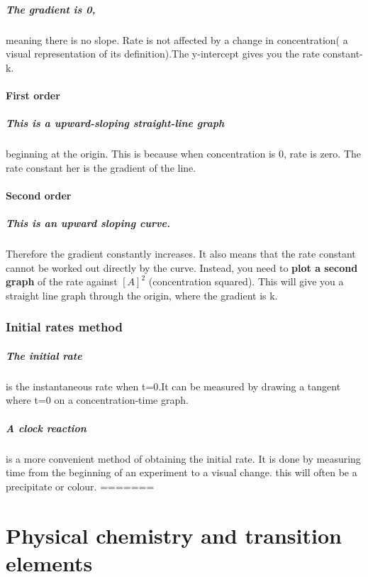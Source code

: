 \paragraph{The gradient is 0,}meaning there is no slope. Rate is not affected by a change in concentration( a visual representation of its definition).The y-intercept gives you the rate constant-k.
\subsubsection{First order}
\paragraph{This is a upward-sloping straight-line graph}beginning at the origin. This is because when concentration is 0, rate is zero. The rate constant her is the gradient of the line.
\subsubsection{Second order}
\paragraph{This is an upward sloping curve.}Therefore the gradient constantly increases. It also means that the rate constant cannot be worked out directly by the curve. Instead, you need to \textbf{plot a second graph} of the rate against $[A]^2$ (concentration squared). This will give you a straight line graph through the origin, where the gradient is k.
\subsection{Initial rates method}
\paragraph{The initial rate}is the instantaneous rate when t=0.It can be measured by drawing a tangent where t=0 on a concentration-time graph.
\paragraph{A clock reaction}is a more convenient method of obtaining the initial rate. It is done by measuring time from the beginning of an experiment to a visual change. this will often be a precipitate or colour.
=======
\chapter{Physical chemistry and transition elements}

